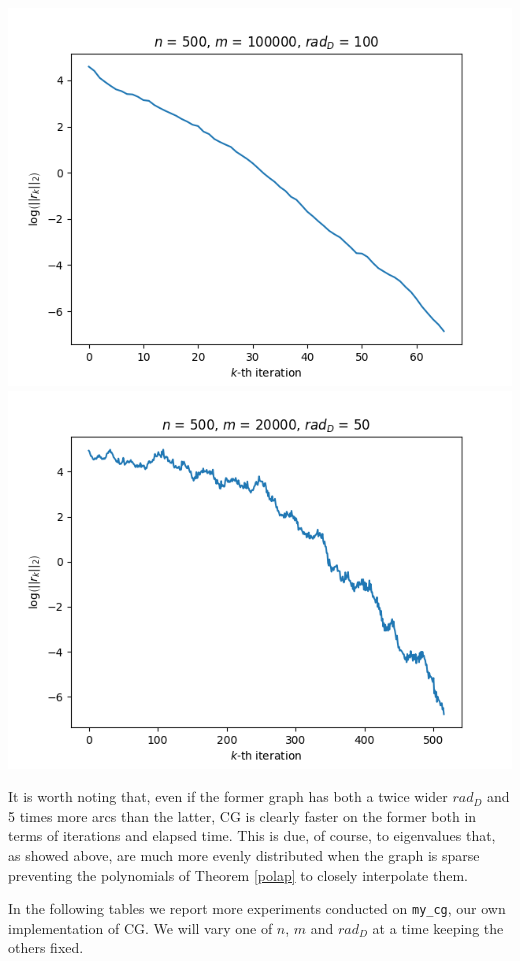 \documentclass[12pt]{article}
\newcommand{\1}{\mathbbm{1}}
\begin{document}
{\includegraphics[scale=0.5, H]{my_cg-500-100000-100.png}
\includegraphics[scale=0.5, H]{my_cg-500-20000-50.png}

It is worth noting that, even if the former graph has both a twice wider $rad_D$ and 5 times more arcs than the latter, CG is clearly faster on the former both in terms of iterations and elapsed time. This is due, of course, to eigenvalues that, as showed above, are much more evenly distributed
when the graph is sparse preventing the polynomials of Theorem \ref{polap} to closely interpolate them. 

In the following tables we report more experiments conducted on \texttt{my\_cg}, our own implementation of CG. We will vary one of $n$, $m$ and $rad_D$ at a time keeping the others fixed.

}
\end{document}

